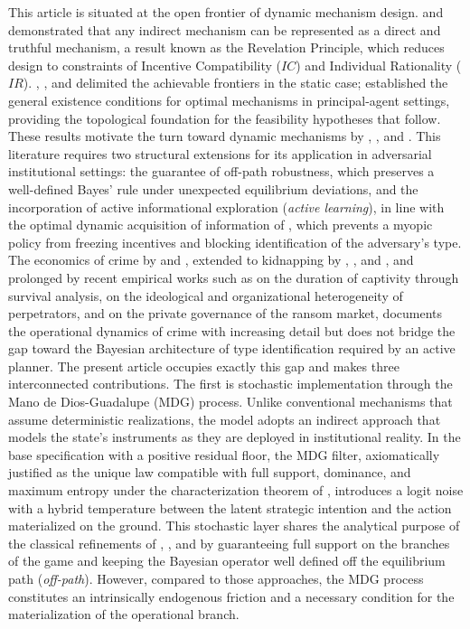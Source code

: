 \documentclass[ecta,nameyear,draft]{econsocart}
\theoremstyle{plain}
\theoremstyle{definition}
\newcommand{\1}{\mathbf{1}}
\begin{document}
This article is situated at the open frontier of dynamic mechanism design. \citet{Gibbard1973} and \citet{Myerson1979IC,Myerson1981} demonstrated that any indirect mechanism can be represented as a direct and truthful mechanism, a result known as the Revelation Principle, which reduces design to constraints of Incentive Compatibility ($IC$) and Individual Rationality ($IR$). \citet{MyersonSatterthwaite1983}, \citet{Rochet1987}, and \citet{RochetChone1998} delimited the achievable frontiers in the static case; \citet{KadanRenySwinkels2017} established the general existence conditions for optimal mechanisms in principal-agent settings, providing the topological foundation for the feasibility hypotheses that follow. These results motivate the turn toward dynamic mechanisms by \citet{CourtyLi2000}, \citet{EsoSzentes2007}, and \citet{PavanSegalToikka2014}. This literature requires two structural extensions for its application in adversarial institutional settings: the guarantee of off-path robustness, which preserves a well-defined Bayes' rule under unexpected equilibrium deviations, and the incorporation of active informational exploration (\textit{active learning}), in line with the optimal dynamic acquisition of information of \citet{Zhong2022}, which prevents a myopic policy from freezing incentives and blocking identification of the adversary's type. The economics of crime by \citet{Becker1968} and \citet{Ehrlich1973}, extended to kidnapping by \citet{Selten1977Kidnapping}, \citet{Iqbal2017Kidnapping}, and \citet{Mejia2000Secuestro}, and prolonged by recent empirical works such as \citet{Detotto2014Ransom} on the duration of captivity through survival analysis, \citet{Forest2012Kidnapping} on the ideological and organizational heterogeneity of perpetrators, and \citet{Shortland2019Kidnap} on the private governance of the ransom market, documents the operational dynamics of crime with increasing detail but does not bridge the gap toward the Bayesian architecture of type identification required by an active planner. The present article occupies exactly this gap and makes three interconnected contributions. The first is stochastic implementation through the Mano de Dios-Guadalupe (MDG) process. Unlike conventional mechanisms that assume deterministic realizations, the model adopts an indirect approach that models the state's instruments as they are deployed in institutional reality. In the base specification with a positive residual floor, the MDG filter, axiomatically justified as the unique law compatible with full support, dominance, and maximum entropy under the characterization theorem of \citet{Jaynes1957Information}, introduces a logit noise with a hybrid temperature between the latent strategic intention and the action materialized on the ground. This stochastic layer shares the analytical purpose of the classical refinements of \citet{Selten1975Perfectness}, \citet{KrepsWilson1982}, and \citet{FudenbergTirole1991} by guaranteeing full support on the branches of the game and keeping the Bayesian operator well defined off the equilibrium path (\textit{off-path}). However, compared to those approaches, the MDG process constitutes an intrinsically endogenous friction and a necessary condition for the materialization of the operational branch.
\end{document}
